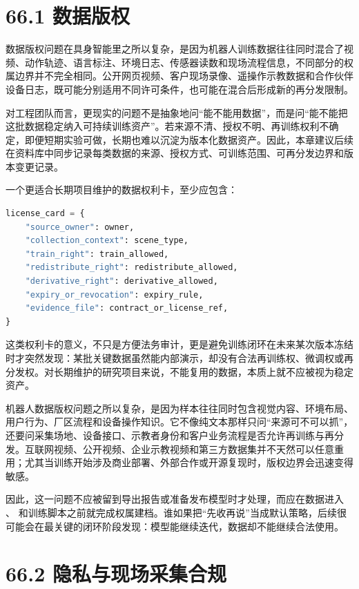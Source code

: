 \section*{66.1 数据版权}


数据版权问题在具身智能里之所以复杂，是因为机器人训练数据往往同时混合了视频、动作轨迹、语言标注、环境日志、传感器读数和现场流程信息，不同部分的权属边界并不完全相同。公开网页视频、客户现场录像、遥操作示教数据和合作伙伴设备日志，既可能分别适用不同许可条件，也可能在混合后形成新的再分发限制。

对工程团队而言，更现实的问题不是抽象地问“能不能用数据”，而是问“能不能把这批数据稳定纳入可持续训练资产”。若来源不清、授权不明、再训练权利不确定，即便短期实验可做，长期也难以沉淀为版本化数据资产。因此，本章建议后续在资料库中同步记录每类数据的来源、授权方式、可训练范围、可再分发边界和版本变更记录。

一个更适合长期项目维护的数据权利卡，至少应包含：

\begin{lstlisting}[language=python]
license_card = {
    "source_owner": owner,
    "collection_context": scene_type,
    "train_right": train_allowed,
    "redistribute_right": redistribute_allowed,
    "derivative_right": derivative_allowed,
    "expiry_or_revocation": expiry_rule,
    "evidence_file": contract_or_license_ref,
}
\end{lstlisting}

这类权利卡的意义，不只是方便法务审计，更是避免训练闭环在未来某次版本冻结时才突然发现：某批关键数据虽然能内部演示，却没有合法再训练权、微调权或再分发权。对长期维护的研究项目来说，不能复用的数据，本质上就不应被视为稳定资产。

机器人数据版权问题之所以复杂，是因为样本往往同时包含视觉内容、环境布局、用户行为、厂区流程和设备操作知识。它不像纯文本那样只问“来源可不可以抓”，还要问采集场地、设备接口、示教者身份和客户业务流程是否允许再训练与再分发。互联网视频、公开视频、企业示教视频和第三方数据集并不天然可以任意重用；尤其当训练开始涉及商业部署、外部合作或开源复现时，版权边界会迅速变得敏感。

因此，这一问题不应被留到导出报告或准备发布模型时才处理，而应在数据进入 、 和训练脚本之前就完成权属建档。谁如果把“先收再说”当成默认策略，后续很可能会在最关键的闭环阶段发现：模型能继续迭代，数据却不能继续合法使用。

\section*{66.2 隐私与现场采集合规}


